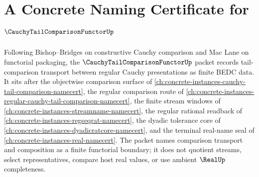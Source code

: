 \chapter{A Concrete Naming Certificate for $\CauchyTailComparisonFunctorUp$}
\label{ch:concrete-instances-cauchy-tail-comparison-functor-namecert}

Following Bishop--Bridges on constructive Cauchy comparison and Mac Lane on functorial packaging, the $\CauchyTailComparisonFunctorUp$ packet records tail-comparison transport between regular Cauchy presentations as finite BEDC data. It sits after the objectwise comparison surface of \autoref{ch:concrete-instances-cauchy-tail-comparison-namecert}, the regular comparison route of \autoref{ch:concrete-instances-regular-cauchy-tail-comparison-namecert}, the finite stream windows of \autoref{ch:concrete-instances-streamname-namecert}, the regular rational readback of \autoref{ch:concrete-instances-regseqrat-namecert}, the dyadic tolerance core of \autoref{ch:concrete-instances-dyadicratcore-namecert}, and the terminal real-name seal of \autoref{ch:concrete-instances-real-namecert}. The packet names comparison transport and composition as a finite functorial boundary; it does not quotient streams, select representatives, compare host real values, or use ambient $\RealUp$ completeness.

